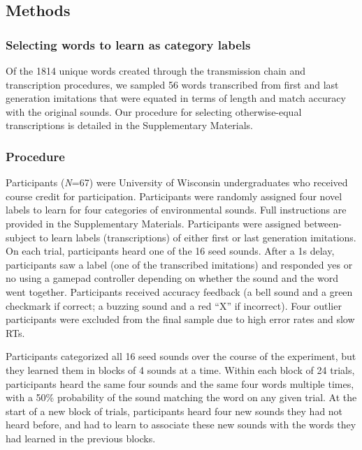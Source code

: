 \documentclass[english,floatsintext,man]{apa6}
\theoremstyle{definition}
\theoremstyle{definition}
\theoremstyle{definition}
\theoremstyle{remark}
\begin{document}
\hypertarget{methods-2}{%
\subsection{Methods}\label{methods-2}}

\hypertarget{selecting-words-to-learn-as-category-labels}{%
\subsubsection{Selecting words to learn as category
labels}\label{selecting-words-to-learn-as-category-labels}}

Of the 1814 unique words created through the transmission chain and
transcription procedures, we sampled 56 words transcribed from first and
last generation imitations that were equated in terms of length and
match accuracy with the original sounds. Our procedure for selecting
otherwise-equal transcriptions is detailed in the Supplementary
Materials.

\hypertarget{procedure}{%
\subsubsection{Procedure}\label{procedure}}

Participants (\emph{N}=67) were University of Wisconsin undergraduates
who received course credit for participation. Participants were randomly
assigned four novel labels to learn for four categories of environmental
sounds. Full instructions are provided in the Supplementary Materials.
Participants were assigned between-subject to learn labels
(transcriptions) of either first or last generation imitations. On each
trial, participants heard one of the 16 seed sounds. After a 1s delay,
participants saw a label (one of the transcribed imitations) and
responded yes or no using a gamepad controller depending on whether the
sound and the word went together. Participants received accuracy
feedback (a bell sound and a green checkmark if correct; a buzzing sound
and a red \enquote{X} if incorrect). Four outlier participants were
excluded from the final sample due to high error rates and slow RTs.

Participants categorized all 16 seed sounds over the course of the
experiment, but they learned them in blocks of 4 sounds at a time.
Within each block of 24 trials, participants heard the same four sounds
and the same four words multiple times, with a 50\% probability of the
sound matching the word on any given trial. At the start of a new block
of trials, participants heard four new sounds they had not heard before,
and had to learn to associate these new sounds with the words they had
learned in the previous blocks.
\end{document}
